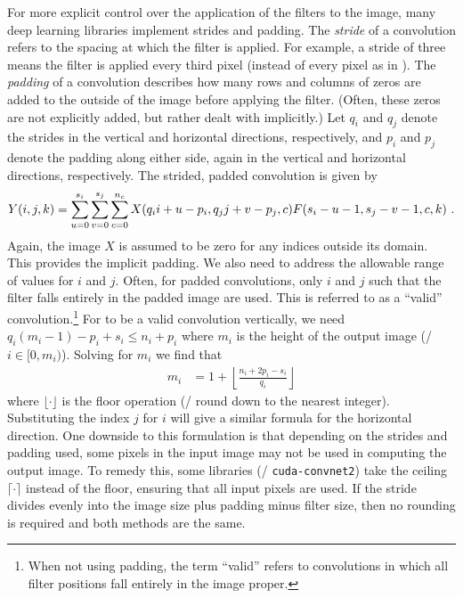 For more explicit control over the application of the filters to the image,
many deep learning libraries implement strides and padding.
The \emph{stride} of a convolution refers to the spacing at which the filter is applied.
For example, a stride of three means the filter is applied every third pixel
(instead of every pixel as in ).
The \emph{padding} of a convolution describes how many rows and columns of zeros
are added to the outside of the image before applying the filter.
(Often, these zeros are not explicitly added,
but rather dealt with implicitly.)
Let $q_i$ and $q_j$ denote the strides
in the vertical and horizontal directions, respectively,
and $p_i$ and $p_j$ denote the padding along either side,
again in the vertical and horizontal directions, respectively.
The strided, padded convolution is given by
\begin{align}
  Y(i,j,k) = \sum_{u=0}^{s_i} \sum_{v=0}^{s_j} \sum_{c=0}^{n_c}
      X(q_i i+u-p_i, q_j j+v-p_j, c) F(s_i-u-1, s_j-v-1, c, k) \text{ .}
  \eqnlabel{convstrided}
\end{align}
Again, the image $X$ is assumed to be zero for any indices outside its domain.
This provides the implicit padding.
We also need to address the allowable range of values for $i$ and $j$.
Often, for padded convolutions, only $i$ and $j$ such that the filter
falls entirely in the padded image are used.
This is referred to as a ``valid'' convolution.\footnote{
  When not using padding,
  the term ``valid'' refers to convolutions in which all filter positions
  fall entirely in the image proper.}
For  to be a valid convolution vertically,
we need $q_i (m_i - 1) - p_i + s_i \le n_i + p_i$
where $m_i$ is the height of the output image (\ie/ $i \in [0, m_i)$).
Solving for $m_i$ we find that
\begin{align}
  m_i &= 1 + \left\lfloor \frac{n_i + 2p_i - s_i}{q_i} \right\rfloor
\end{align}
where $\lfloor\cdot\rfloor$ is the floor operation (\ie/ round down to the nearest integer).
Substituting the index $j$ for $i$ will give a similar formula
for the horizontal direction.
One downside to this formulation is that depending on the strides and padding used,
some pixels in the input image may not be used in computing the output image.
To remedy this, some libraries (\eg/ \texttt{cuda-convnet2})
take the ceiling $\lceil\cdot\rceil$ instead of the floor,
ensuring that all input pixels are used.
If the stride divides evenly into the image size plus padding minus filter size,
then no rounding is required and both methods are the same.


